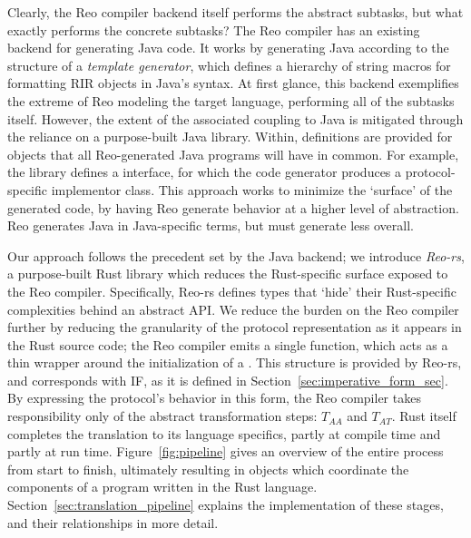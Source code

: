 Clearly, the Reo compiler backend itself performs the abstract subtasks, but what exactly performs the concrete subtasks?
The Reo compiler has an existing backend for generating Java code. It works by generating Java according to the structure of a \textit{template generator}, which defines a hierarchy of string macros for formatting RIR objects in Java's syntax. At first glance, this backend exemplifies the extreme of Reo modeling the target language, performing all of the subtasks itself. However, the extent of the associated coupling to Java is mitigated through the reliance on a purpose-built Java library. Within, definitions are provided for objects that all Reo-generated Java programs will have in common. For example, the library defines a  interface, for which the code generator produces a protocol-specific implementor class. This approach works to minimize the `surface' of the generated code, by having Reo generate behavior at a higher level of abstraction. Reo generates Java in Java-specific terms, but must generate less overall.

Our approach follows the precedent set by the Java backend; we introduce \textit{Reo-rs}, a purpose-built Rust library which reduces the Rust-specific surface exposed to the Reo compiler. Specifically, Reo-rs defines types that `hide' their Rust-specific complexities behind an abstract API. We reduce the burden on the Reo compiler further by reducing the granularity of the protocol representation as it appears in the Rust source code; the Reo compiler emits a single  function, which acts as a thin wrapper around the initialization of a . This structure is provided by Reo-rs, and corresponds with IF, as it is defined in Section~\ref{sec:imperative_form_sec}. By expressing the protocol's behavior in this form, the Reo compiler takes responsibility only of the abstract transformation steps: $T_{AA}$ and $T_{AT}$. Rust itself completes the translation to its language specifics, partly at compile time and partly at run time. Figure~\ref{fig:pipeline} gives an overview of the entire process from start to finish, ultimately resulting in objects which coordinate the components of a program written in the Rust language. Section~\ref{sec:translation_pipeline} explains the implementation of these stages, and their relationships in more detail.


